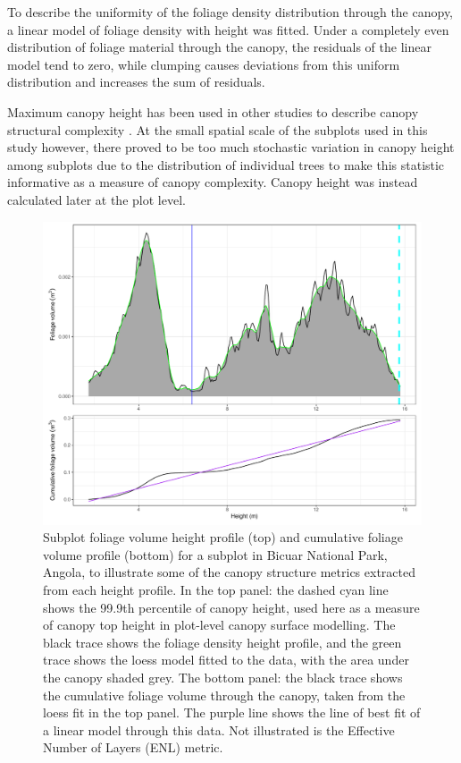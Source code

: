 \documentclass[11pt,a4paper]{article}
\begin{document}
To describe the uniformity of the foliage density distribution through the canopy, a linear model of foliage density with height was fitted. Under a completely even distribution of foliage material through the canopy, the residuals of the linear model tend to zero, while clumping causes deviations from this uniform distribution and increases the sum of residuals.

Maximum canopy height has been used in other studies to describe canopy structural complexity \citep{Scheuermann2018}. At the small spatial scale of the subplots used in this study however, there proved to be too much stochastic variation in canopy height among subplots due to the distribution of individual trees to make this statistic informative as a measure of canopy complexity. Canopy height was instead calculated later at the plot level. 

\begin{figure}
\centering
	\includegraphics[width=\linewidth]{height_profile_illus_all}
	\caption{Subplot foliage volume height profile (top) and cumulative foliage volume profile (bottom) for a subplot in Bicuar National Park, Angola, to illustrate some of the canopy structure metrics extracted from each height profile. In the top panel: the dashed cyan line shows the 99.9th percentile of canopy height, used here as a measure of canopy top height in plot-level canopy surface modelling. The black trace shows the foliage density height profile, and the green trace shows the loess model fitted to the data, with the area under the canopy shaded grey. The bottom panel: the black trace shows the cumulative foliage volume through the canopy, taken from the loess fit in the top panel. The purple line shows the line of best fit of a linear model through this data. Not illustrated is the Effective Number of Layers (ENL) metric.}
	\label{height_profile_illus}
\end{figure}
\end{document}
